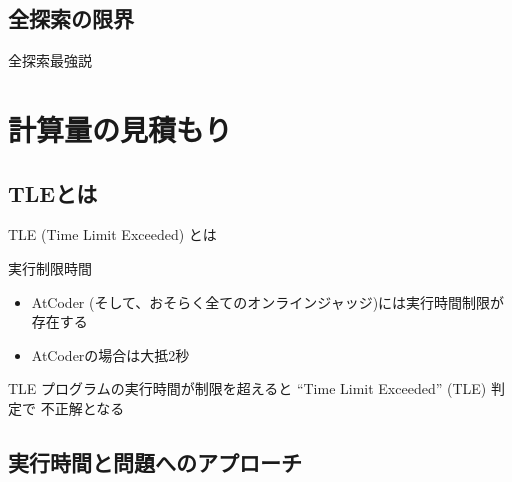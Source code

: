 \documentclass[dvipdfmx]{beamer}
\begin{document}
\subsection{全探索の限界}

\begin{frame}{全探索最強説}
  \centering

\end{frame}

\section{計算量の見積もり}

\subsection{TLEとは}

\begin{frame}{TLE (Time Limit Exceeded) とは}
  \begin{block}{実行制限時間}
    \begin{itemize}
      \item AtCoder (そして、おそらく全てのオンラインジャッジ)には実行時間制限が存在する
      \item AtCoderの場合は大抵2秒
    \end{itemize}
  \end{block}
  \begin{block}{TLE}
    プログラムの実行時間が制限を超えると ``Time Limit Exceeded'' (TLE) 判定で
    不正解となる
  \end{block}
\end{frame}

\subsection{実行時間と問題へのアプローチ}
\end{document}
